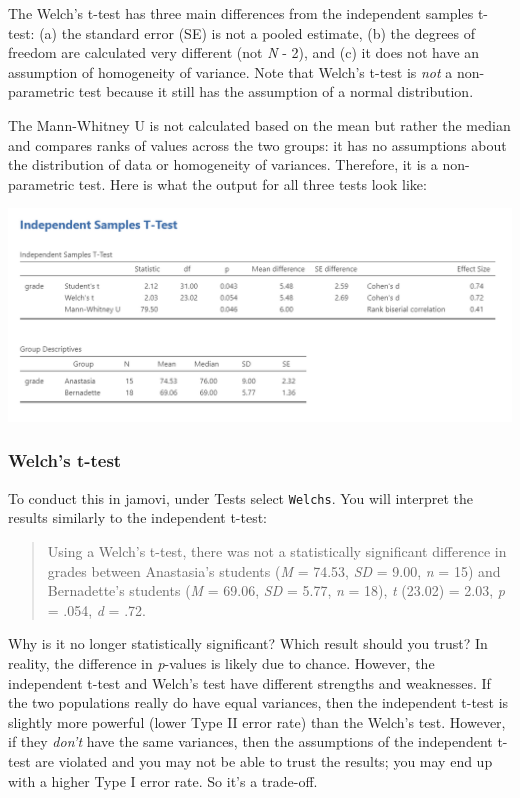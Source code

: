 \documentclass[
]{book}
\begin{document}
The Welch's t-test has three main differences from the independent samples t-test: (a) the standard error (SE) is not a pooled estimate, (b) the degrees of freedom are calculated very different (not \emph{N} - 2), and (c) it does not have an assumption of homogeneity of variance. Note that Welch's t-test is \emph{not} a non-parametric test because it still has the assumption of a normal distribution.

The Mann-Whitney U is not calculated based on the mean but rather the median and compares ranks of values across the two groups: it has no assumptions about the distribution of data or homogeneity of variances. Therefore, it is a non-parametric test. Here is what the output for all three tests look like:

\includegraphics{images/02-independent_t-test/independent_t-test_full-results.png}

\hypertarget{welchs-t-test}{%
\subsubsection{Welch's t-test}\label{welchs-t-test}}

To conduct this in jamovi, under Tests select \texttt{Welch\textquotesingle{}s}. You will interpret the results similarly to the independent t-test:

\begin{quote}
Using a Welch's t-test, there was not a statistically significant difference in grades between Anastasia's students (\emph{M} = 74.53, \emph{SD} = 9.00, \emph{n} = 15) and Bernadette's students (\emph{M} = 69.06, \emph{SD} = 5.77, \emph{n} = 18), \emph{t} (23.02) = 2.03, \emph{p} = .054, \emph{d} = .72.
\end{quote}

Why is it no longer statistically significant? Which result should you trust? In reality, the difference in \emph{p}-values is likely due to chance. However, the independent t-test and Welch's test have different strengths and weaknesses. If the two populations really do have equal variances, then the independent t-test is slightly more powerful (lower Type II error rate) than the Welch's test. However, if they \emph{don't} have the same variances, then the assumptions of the independent t-test are violated and you may not be able to trust the results; you may end up with a higher Type I error rate. So it's a trade-off.
\end{document}
